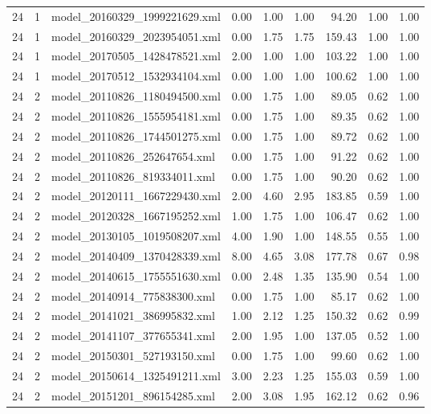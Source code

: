\begin{table}[ht]
\begin{tabular}{rrlrrrrrr}
   24 &   1 & model\_20160329\_1999221629.xml & 0.00 & 1.00 & 1.00 & 94.20 & 1.00 & 1.00 \\ 
   24 &   1 & model\_20160329\_2023954051.xml & 0.00 & 1.75 & 1.75 & 159.43 & 1.00 & 1.00 \\ 
   24 &   1 & model\_20170505\_1428478521.xml & 2.00 & 1.00 & 1.00 & 103.22 & 1.00 & 1.00 \\ 
   24 &   1 & model\_20170512\_1532934104.xml & 0.00 & 1.00 & 1.00 & 100.62 & 1.00 & 1.00 \\ 
   24 &   2 & model\_20110826\_1180494500.xml & 0.00 & 1.75 & 1.00 & 89.05 & 0.62 & 1.00 \\ 
   24 &   2 & model\_20110826\_1555954181.xml & 0.00 & 1.75 & 1.00 & 89.35 & 0.62 & 1.00 \\ 
   24 &   2 & model\_20110826\_1744501275.xml & 0.00 & 1.75 & 1.00 & 89.72 & 0.62 & 1.00 \\ 
   24 &   2 & model\_20110826\_252647654.xml & 0.00 & 1.75 & 1.00 & 91.22 & 0.62 & 1.00 \\ 
   24 &   2 & model\_20110826\_819334011.xml & 0.00 & 1.75 & 1.00 & 90.20 & 0.62 & 1.00 \\ 
   24 &   2 & model\_20120111\_1667229430.xml & 2.00 & 4.60 & 2.95 & 183.85 & 0.59 & 1.00 \\ 
   24 &   2 & model\_20120328\_1667195252.xml & 1.00 & 1.75 & 1.00 & 106.47 & 0.62 & 1.00 \\ 
   24 &   2 & model\_20130105\_1019508207.xml & 4.00 & 1.90 & 1.00 & 148.55 & 0.55 & 1.00 \\ 
   24 &   2 & model\_20140409\_1370428339.xml & 8.00 & 4.65 & 3.08 & 177.78 & 0.67 & 0.98 \\ 
   24 &   2 & model\_20140615\_1755551630.xml & 0.00 & 2.48 & 1.35 & 135.90 & 0.54 & 1.00 \\ 
   24 &   2 & model\_20140914\_775838300.xml & 0.00 & 1.75 & 1.00 & 85.17 & 0.62 & 1.00 \\ 
   24 &   2 & model\_20141021\_386995832.xml & 1.00 & 2.12 & 1.25 & 150.32 & 0.62 & 0.99 \\ 
   24 &   2 & model\_20141107\_377655341.xml & 2.00 & 1.95 & 1.00 & 137.05 & 0.52 & 1.00 \\ 
   24 &   2 & model\_20150301\_527193150.xml & 0.00 & 1.75 & 1.00 & 99.60 & 0.62 & 1.00 \\ 
   24 &   2 & model\_20150614\_1325491211.xml & 3.00 & 2.23 & 1.25 & 155.03 & 0.59 & 1.00 \\ 
   24 &   2 & model\_20151201\_896154285.xml & 2.00 & 3.08 & 1.95 & 162.12 & 0.62 & 0.96 \\ 

\end{tabular}
\end{table}
